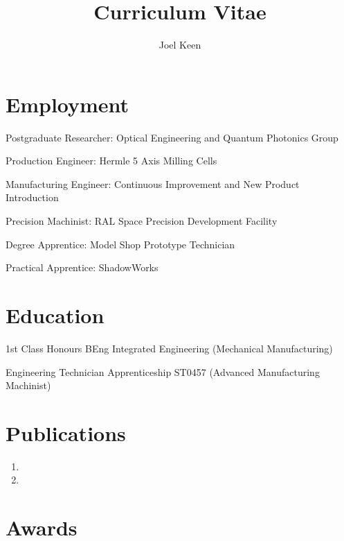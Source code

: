 \documentclass{cv}
\title{Curriculum Vitae}
\author{Joel Keen}
\begin{document}


\maketitle

\section{Employment}

Postgraduate Researcher: Optical Engineering and Quantum Photonics Group

Production Engineer: Hermle 5 Axis Milling Cells

Manufacturing Engineer: Continuous Improvement and New Product Introduction

Precision Machinist: RAL Space Precision Development Facility

Degree Apprentice: Model Shop Prototype Technician 

Practical Apprentice: ShadowWorks

\section{Education}

1st Class Honours BEng Integrated Engineering (Mechanical Manufacturing)

 Engineering Technician Apprenticeship ST0457 (Advanced Manufacturing Machinist)

\section{Publications}
\begin{enumerate}

\item{}

\item{}


\end{enumerate}

\section{Awards}
\end{document}
